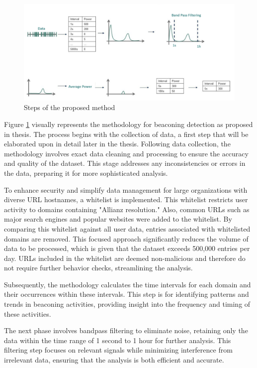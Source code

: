 \begin{figure}
    \centering
    \includegraphics[width=\textwidth]{../Thesis_Docs/media/methodchart.png}
    \caption{Steps of the proposed method}
    \label{fig:mchart}
\end{figure}

Figure \ref{fig:mchart} visually represents the methodology for beaconing detection as proposed in thesis. The process begins with the collection of data, a first step that will be elaborated upon in detail later in the thesis. Following data collection, the methodology involves exact data cleaning and processing to ensure the accuracy and quality of the dataset. This stage addresses any inconsistencies or errors in the data, preparing it for more sophisticated analysis.

To enhance security and simplify data management for large organizations with diverse URL hostnames, a whitelist is implemented. This whitelist restricts user activity to domains containing "Allianz resolution." Also, common URLs such as major search engines and popular websites were added to the whitelist. By comparing this whitelist against all user data, entries associated with whitelisted domains are removed. This focused approach significantly reduces the volume of data to be processed, which is given that the dataset exceeds 500,000 entries per day. URLs included in the whitelist are deemed non-malicious and therefore do not require further behavior checks, streamlining the analysis.

Subsequently, the methodology calculates the time intervals for each domain and their occurrences within these intervals. This step is for identifying patterns and trends in beaconing activities, providing insight into the frequency and timing of these activities.

The next phase involves bandpass filtering to eliminate noise, retaining only the data within the time range of 1 second to 1 hour for further analysis. This filtering step focuses on relevant signals while minimizing interference from irrelevant data, ensuring that the analysis is both efficient and accurate.

